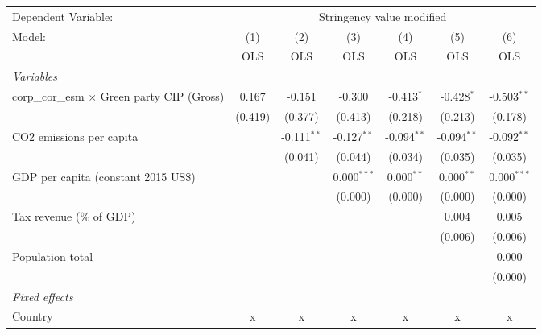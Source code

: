 
\begingroup
\centering
\begin{tabular}{lcccccc}
   \toprule
   Dependent Variable: & \multicolumn{6}{c}{Stringency value modified}\\
   Model:                                             & (1)     & (2)           & (3)           & (4)           & (5)           & (6)\\  
                                                      &  OLS    & OLS           & OLS           & OLS           & OLS           & OLS\\  
   \midrule
   \emph{Variables}\\
   corp\_cor\_esm $\times$ Green party CIP (Gross)    & 0.167   & -0.151        & -0.300        & -0.413$^{*}$  & -0.428$^{*}$  & -0.503$^{**}$\\   
                                                      & (0.419) & (0.377)       & (0.413)       & (0.218)       & (0.213)       & (0.178)\\   
   CO2 emissions per capita                           &         & -0.111$^{**}$ & -0.127$^{**}$ & -0.094$^{**}$ & -0.094$^{**}$ & -0.092$^{**}$\\   
                                                      &         & (0.041)       & (0.044)       & (0.034)       & (0.035)       & (0.035)\\   
   GDP per capita (constant 2015 US\$)                &         &               & 0.000$^{***}$ & 0.000$^{**}$  & 0.000$^{**}$  & 0.000$^{***}$\\   
                                                      &         &               & (0.000)       & (0.000)       & (0.000)       & (0.000)\\   
   Tax revenue (\% of GDP)                            &         &               &               &               & 0.004         & 0.005\\   
                                                      &         &               &               &               & (0.006)       & (0.006)\\   
   Population total                                   &         &               &               &               &               & 0.000\\   
                                                      &         &               &               &               &               & (0.000)\\   
   \emph{Fixed effects}\\
   Country                                            & x       & x             & x             & x             & x             & x\\  

\end{tabular}
